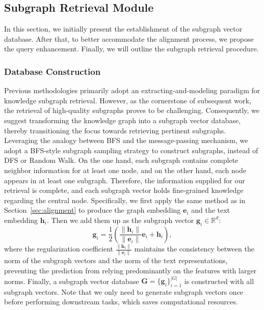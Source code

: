 \documentclass[runningheads]{llncs}
\begin{document}
\subsection{Subgraph Retrieval Module}
\label{sec:retrieval}
In this section, we initially present the establishment of the subgraph vector database. After that, to better accommodate the alignment process, we propose the query enhancement. Finally, we will outline the subgraph retrieval procedure. 

\subsubsection{Database Construction}
Previous methodologies primarily adopt an extracting-and-modeling paradigm for knowledge subgraph retrieval. However, as the cornerstone of subsequent work, the retrieval of high-quality subgraphs proves to be challenging. Consequently, we suggest transforming the knowledge graph into a subgraph vector database, thereby transitioning the focus towards retrieving pertinent subgraphs. Leveraging the analogy between BFS and the message-passing mechanism, we adopt a BFS-style subgraph sampling strategy to construct subgraphs, instead of DFS or Random Walk. On the one hand, each subgraph contains complete neighbor information for at least one node, and on the other hand, each node appears in at least one subgraph. Therefore, the information supplied for our retrieval is complete, and each subgraph vector holds fine-grained knowledge regarding the central node. Specifically, we first apply the same method as in Section~\ref{sec:alignment} to produce the graph embedding $\boldsymbol{e}_i$ and the text embedding $\boldsymbol{h}_i$. Then we add them up as the subgraph vector $\boldsymbol{g}_i \in \mathbb{R}^d$:
\begin{equation}
    \boldsymbol{g}_i = \frac{1}{2}(\frac{\lVert \boldsymbol{h}_i \rVert}{\lVert \boldsymbol{e}_i \rVert}\boldsymbol{e}_i + \boldsymbol{h}_i),
\end{equation}
where the regularization coefficient $\frac{\lVert \boldsymbol{h}_i \rVert}{\lVert \boldsymbol{e}_i \rVert}$ maintains the consistency between the norm of the subgraph vectors and the norm of the text representations, preventing the prediction from relying predominantly on the features with larger norms. Finally, a subgraph vector database $\boldsymbol{G} = \{\boldsymbol{g}_i\}_{i=1}^{\lvert G \rvert}$ is constructed with all subgraph vectors. Note that we only need to generate subgraph vectors once before performing downstream tasks, which saves computational resources.
\end{document}
